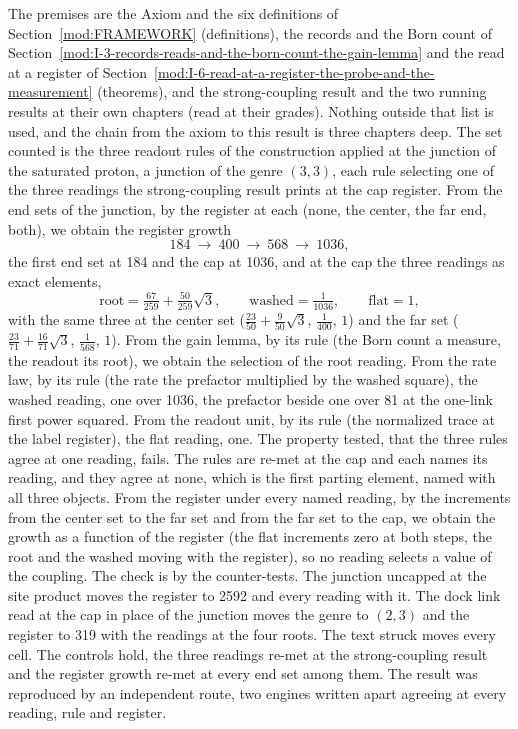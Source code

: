 \begin{chproof}[census]
The premises are the Axiom and the six definitions of Section~\ref{mod:FRAMEWORK} (definitions), the records and the Born count of Section~\ref{mod:I-3-records-reads-and-the-born-count-the-gain-lemma} and the read at a register of Section~\ref{mod:I-6-read-at-a-register-the-probe-and-the-measurement} (theorems), and the strong-coupling result and the two running results at their own chapters (read at their grades). Nothing outside that list is used, and the chain from the axiom to this result is three chapters deep.
The set counted is the three readout rules of the construction applied at the junction of the saturated proton, a junction of the genre $(3,3)$, each rule selecting one of the three readings the strong-coupling result prints at the cap register. From the end sets of the junction, by the register at each (none, the center, the far end, both), we obtain the register growth
\begin{equation}
184 \ \to\ 400 \ \to\ 568 \ \to\ 1036 ,
\end{equation}
the first end set at 184 and the cap at 1036, and at the cap the three readings as exact elements,
\begin{equation}
\text{root} = \tfrac{67}{259} + \tfrac{50}{259}\sqrt{3}, \qquad \text{washed} = \tfrac{1}{1036}, \qquad \text{flat} = 1 ,
\end{equation}
with the same three at the center set ($\tfrac{23}{50} + \tfrac{9}{50}\sqrt{3}$, $\tfrac{1}{400}$, $1$) and the far set ($\tfrac{23}{71} + \tfrac{16}{71}\sqrt{3}$, $\tfrac{1}{568}$, $1$). From the gain lemma, by its rule (the Born count a measure, the readout its root), we obtain the selection of the root reading. From the rate law, by its rule (the rate the prefactor multiplied by the washed square), the washed reading, one over 1036, the prefactor beside one over 81 at the one-link first power squared. From the readout unit, by its rule (the normalized trace at the label register), the flat reading, one. The property tested, that the three rules agree at one reading, fails. The rules are re-met at the cap and each names its reading, and they agree at none, which is the first parting element, named with all three objects. From the register under every named reading, by the increments from the center set to the far set and from the far set to the cap, we obtain the growth as a function of the register (the flat increments zero at both steps, the root and the washed moving with the register), so no reading selects a value of the coupling.
The check is by the counter-tests. The junction uncapped at the site product moves the register to 2592 and every reading with it. The dock link read at the cap in place of the junction moves the genre to $(2,3)$ and the register to 319 with the readings at the four roots. The text struck moves every cell. The controls hold, the three readings re-met at the strong-coupling result and the register growth re-met at every end set among them.
The result was reproduced by an independent route, two engines written apart agreeing at every reading, rule and register.
\end{chproof}

